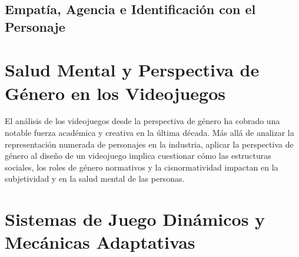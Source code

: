 \subsection{Empatía, Agencia e Identificación con el Personaje}
\section{Salud Mental y Perspectiva de Género en los Videojuegos}
El análisis de los videojuegos desde la perspectiva de género ha cobrado una notable fuerza académica y creativa en la última década. Más allá de analizar la representación numerada de personajes en la industria, aplicar la perspectiva de género al diseño de un videojuego implica cuestionar cómo las estructuras sociales, los roles de género normativos y la cisnormatividad impactan en la subjetividad y en la salud mental de las personas.

\section{Sistemas de Juego Dinámicos y Mecánicas Adaptativas}
